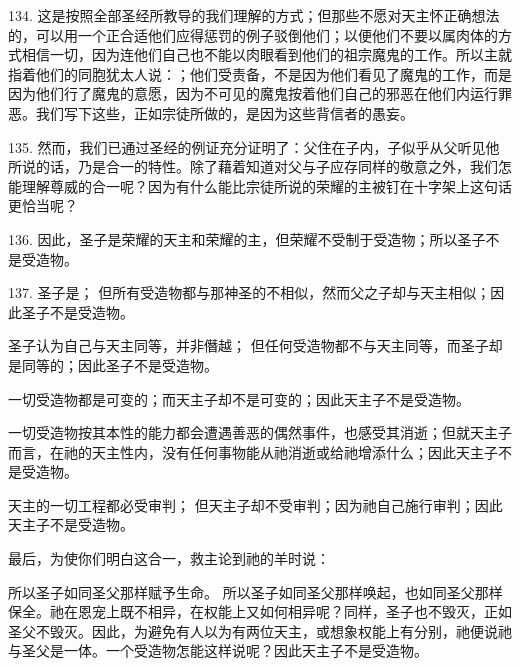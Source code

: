 134. 这是按照全部圣经所教导的我们理解的方式；但那些不愿对天主怀正确想法的，可以用一个正合适他们应得惩罚的例子驳倒他们；以便他们不要以属肉体的方式相信一切，因为连他们自己也不能以肉眼看到他们的祖宗魔鬼的工作。所以主就指着他们的同胞犹太人说：；他们受责备，不是因为他们看见了魔鬼的工作，而是因为他们行了魔鬼的意愿，因为不可见的魔鬼按着他们自己的邪恶在他们内运行罪恶。我们写下这些，正如宗徒所做的，是因为这些背信者的愚妄。\par

135. 然而，我们已通过圣经的例证充分证明了：父住在子内，子似乎从父听见他所说的话，乃是合一的特性。除了藉着知道对父与子应存同样的敬意之外，我们怎能理解尊威的合一呢？因为有什么能比宗徒所说的荣耀的主被钉在十字架上这句话更恰当呢？\par

136. 因此，圣子是荣耀的天主和荣耀的主，但荣耀不受制于受造物；所以圣子不是受造物。\par

137. 圣子是； 但所有受造物都与那神圣的不相似，然而父之子却与天主相似；因此圣子不是受造物。\par

圣子认为自己与天主同等，并非僭越； 但任何受造物都不与天主同等，而圣子却是同等的；因此圣子不是受造物。\par

一切受造物都是可变的；而天主子却不是可变的；因此天主子不是受造物。\par

一切受造物按其本性的能力都会遭遇善恶的偶然事件，也感受其消逝；但就天主子而言，在祂的天主性内，没有任何事物能从祂消逝或给祂增添什么；因此天主子不是受造物。\par

天主的一切工程都必受审判； 但天主子却不受审判；因为祂自己施行审判；因此天主子不是受造物。\par

最后，为使你们明白这合一，救主论到祂的羊时说：\par

所以圣子如同圣父那样赋予生命。 所以圣子如同圣父那样唤起，也如同圣父那样保全。祂在恩宠上既不相异，在权能上又如何相异呢？同样，圣子也不毁灭，正如圣父不毁灭。因此，为避免有人以为有两位天主，或想象权能上有分别，祂便说祂与圣父是一体。一个受造物怎能这样说呢？因此天主子不是受造物。\par

